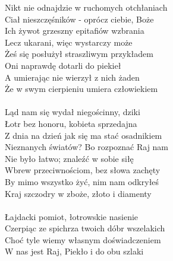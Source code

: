 \documentclass[a5paper, 10pt]{book}
\begin{document}
\newpage
\begin{minipage}[t]{0.7\textwidth}

  \hspace*{4mm} Nikt nie odnajdzie w ruchomych otchłaniach\\
  \hspace*{4mm} Ciał nieszczęśników - oprócz ciebie, Boże\\
  \hspace*{4mm} Ich żywot grzeszny epitafiów wzbrania\\
  \hspace*{4mm} Lecz ukarani, więc wystarczy może\\
  \hspace*{4mm} Żeś się posłużył straszliwym przykładem\\
  \hspace*{4mm} Oni naprawdę dotarli do piekieł\\
  \hspace*{4mm} A umierając nie wierzył z nich żaden\\
  \hspace*{4mm} Że w swym cierpieniu umiera człowiekiem\\
  \\

  Ląd nam się wydał niegościnny, dziki\\
  Łotr bez honoru, kobieta sprzedajna\\
  Z dnia na dzień jak się ma stać osadnikiem\\
  Nieznanych światów? Bo rozpoznać Raj nam\\
  Nie było łatwo; znaleźć w sobie siłę\\
  Wbrew przeciwnościom, bez słowa zachęty\\
  By mimo wszystko żyć, nim nam odkryłeś\\
  Kraj szczodry w zboże, złoto i diamenty\\
  \\

  \hspace*{4mm} Łajdacki pomiot, łotrowskie nasienie\\
  \hspace*{4mm} Czerpiąc ze spichrza twoich dóbr wszelakich\\
  \hspace*{4mm} Choć tyle wiemy własnym doświadczeniem\\
  \hspace*{4mm} W nas jest Raj, Piekło i do obu szlaki\\
  \\
\end{minipage}
\end{document}
